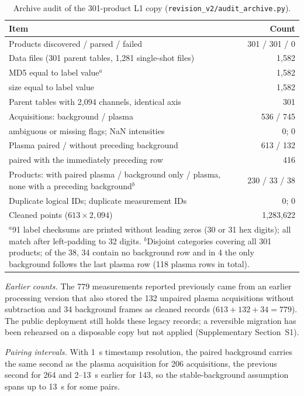 \documentclass[final,5p,twocolumn,a4paper]{elsarticle}
\begin{document}
\begin{table}[!htbp]
\centering
\footnotesize
\setlength{\tabcolsep}{3pt}
\begin{tabular}{@{}p{5.4cm}r@{}}
\toprule
\textbf{Item} & \textbf{Count} \\
\midrule
Products discovered / parsed / failed & 301 / 301 / 0 \\
Data files (301 parent tables, 1,281 single-shot files) & 1,582 \\
\quad MD5 equal to label value$^{a}$ & 1,582 \\
\quad size equal to label value & 1,582 \\
Parent tables with 2,094 channels, identical axis & 301 \\
Acquisitions: background / plasma & 536 / 745 \\
\quad ambiguous or missing flags; NaN intensities & 0; 0 \\
Plasma paired / without preceding background & 613 / 132 \\
\quad paired with the immediately preceding row & 416 \\
Products: with paired plasma / background only / plasma, none with a preceding background$^{b}$ & 230 / 33 / 38 \\
Duplicate logical IDs; duplicate measurement IDs & 0; 0 \\
Cleaned points ($613\times2{,}094$) & 1,283,622 \\
\bottomrule
\multicolumn{2}{p{7.6cm}}{\scriptsize $^{a}$91 label checksums are printed without leading zeros (30 or 31 hex digits); all match after left-padding to 32 digits. $^{b}$Disjoint categories covering all 301 products; of the 38, 34 contain no background row and in 4 the only background follows the last plasma row (118 plasma rows in total).}
\end{tabular}
\caption{Archive audit of the 301-product L1 copy (\texttt{revision\_v2/audit\_archive.py}).}
\label{table:audit}
\end{table}

\textit{Earlier counts.} The 779 measurements reported previously came from an earlier processing version that also stored the 132 unpaired plasma acquisitions without subtraction and 34 background frames as cleaned records ($613+132+34=779$). The public deployment still holds these legacy records; a reversible migration has been rehearsed on a disposable copy but not applied (Supplementary Section~S1).

\textit{Pairing intervals.} With 1~s timestamp resolution, the paired background carries the same second as the plasma acquisition for 206 acquisitions, the previous second for 264 and 2--13~s earlier for 143, so the stable-background assumption spans up to 13~s for some pairs.
\end{document}
